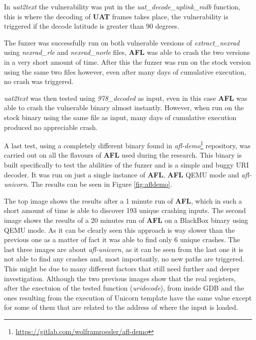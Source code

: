 \documentclass[../main.tex]{subfiles}
\begin{document}
In \textit{uat2text} the vulnerability was put in the
\textit{uat\_decode\_uplink\_mdb} function, this is where the decoding of
\textbf{UAT} frames takes place, the vulnerability is triggered if the decode
latitude is greater than 90 degrees.

The fuzzer was successfully run on both vulnerable versions of
\textit{extract\_nexrad} using \textit{nexrad\_rle} and \textit{nexrad\_norle}
files, \textbf{AFL} was able to crash the two versions in a very short amount of
time. After this the fuzzer was run on the stock version using the same two
files however, even after many days of cumulative execution, no crash was
triggered.

\textit{uat2text} was then tested using \textit{978\_decoded} as input, even in
this case \textbf{AFL} was able to crash the vulnerable binary almost instantly.
However, when run on the stock binary using the same file as input, many days of
cumulative execution produced no appreciable crash.

A last test, using a completely different binary found in
\textit{afl-demo}\footnote{\url{https://gitlab.com/wolframroesler/afl-demo}}
repository, was carried out on all the flavours of \textbf{AFL} used during the
research. This binary is built specifically to test the abilities of the fuzzer
and is a simple and buggy URI decoder. It was run on just a single instance of
\textbf{AFL}, \textbf{AFL} QEMU mode and \textit{afl-unicorn}. The results can
be seen in Figure \ref{fig:afldemo}.

The top image shows the results after a 1 minute run of \textbf{AFL}, which
in such a short amount of time is able to discover 193 unique crashing inputs.
The second image shows the results of a 20 minutes run of \textbf{AFL} on a
BlackBox binary using QEMU mode. As it can be clearly seen this approach is way
slower than the previous one as a matter of fact it was able to find only 6
unique crashes. The last three images are about \textit{afl-unicorn}, as it can
be seen from the last one it is not able to find any crashes and, most
importantly, no new paths are triggered. This might be due to many different
factors that still need further and deeper investigation. Although the two
previous images show that the real registers, after the exectuion of the tested
function (\textit{uridecode}), from inside GDB and the ones resulting from the
execution of Unicorn template have the same value except for some of them that
are related to the address of where the input is loaded.
\end{document}
